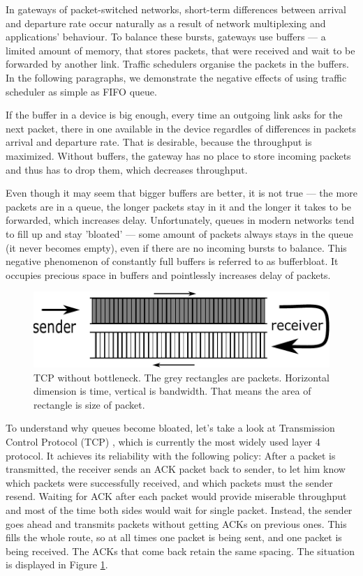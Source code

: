In gateways of packet-switched networks, short-term differences between arrival and departure rate occur naturally as a result of network multiplexing and applications' behaviour. To balance these bursts, gateways use buffers --- a limited amount of memory, that stores packets, that were received and wait to be forwarded by another link. Traffic schedulers organise the packets in the buffers. In the following paragraphs, we demonstrate the negative effects of using traffic scheduler as simple as FIFO queue.


If the buffer in a device is big enough, every time an outgoing link asks for the next packet, there in one available in the device regardles of differences in packets arrival and departure rate. That is desirable, because the throughput is maximized. Without buffers, the gateway has no place to store incoming packets and thus has to drop them, which decreases throughput.

Even though it may seem that bigger buffers are better, it is not true --- the more packets are in a queue, the longer packets stay in it and the longer it takes to be forwarded, which increases delay. Unfortunately, queues in modern networks tend to fill up and stay 'bloated' \cite{Gettys:2012:BDB:2063176.2063196} --- some amount of packets always stays in the queue (it never becomes empty), even if there are no incoming bursts to balance. This negative phenomenon of constantly full buffers is referred to as bufferbloat. It occupies precious space in buffers and pointlessly increases delay of packets.

\begin{figure}
	\centering
	\includegraphics[width=137mm]{drawings/tcp_no_bottleneck}
	\caption{TCP without bottleneck. The grey rectangles are packets. Horizontal dimension is time, vertical is bandwidth. That means the area of rectangle is size of packet.}
	\label{fig01:no_bottle}
\end{figure}

To understand why queues become bloated, let's take a look at Transmission Control Protocol (TCP) \cite{rfc793}, which is currently the most widely used layer 4 protocol. It achieves its reliability with the following policy: After a packet is transmitted, the receiver sends an ACK packet back to sender, to let him know which packets were successfully received, and which packets must the sender resend. Waiting for ACK after each packet would provide miserable throughput and most of the time both sides would wait for single packet. Instead, the sender goes ahead and transmits packets without getting ACKs on previous ones. This fills the whole route, so at all times one packet is being sent, and one packet is being received. The ACKs that come back retain the same spacing. The situation is displayed in Figure \ref{fig01:no_bottle}.

